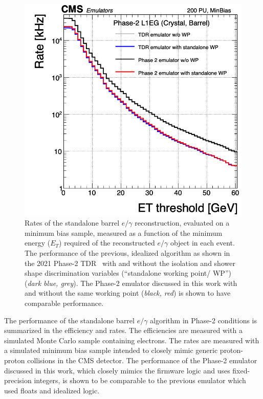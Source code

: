 \begin{figure}[ht]
    \centering
    \includegraphics[width=12cm]{figures/ch-3-phase2/results-egamma-rates.png}
    \caption[Rates of the standalone barrel $e/\gamma$ reconstruction measured as a function of the minimum energy ($E_T$) required of the reconstructed $e/\gamma$ object in each event.]{Rates of the standalone barrel $e/\gamma$ reconstruction, evaluated on a minimum bias sample, measured as a function of the minimum energy ($E_T$) required of the reconstructed $e/\gamma$ object in each event. The performance of the previous, idealized algorithm as shown in the 2021 Phase-2 TDR~\cite{CMS-TDR-021} with and without the isolation and shower shape discrimination variables (``standalone working point/ WP'') (\textit{dark blue, grey}). The Phase-2 emulator discussed in this work with and without the same working point (\textit{black, red}) is shown to have comparable performance.}
    \label{fig:results-egamma-rates}
\end{figure}


The performance of the standalone barrel $e/\gamma$ algorithm in Phase-2 conditions is summarized in the efficiency and rates. The efficiencies are measured with a simulated Monte Carlo sample containing electrons. The rates are measured with a simulated minimum bias sample intended to closely mimic generic proton-proton collisions in the CMS detector. The performance of the Phase-2 emulator discussed in this work, which closely mimics the firmware logic and uses fixed-precision integers, is shown to be comparable to the previous emulator which used floats and idealized logic.


